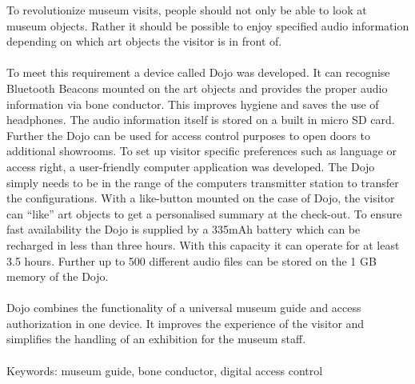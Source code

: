 To revolutionize museum visits, people should not only be able to look at museum objects. Rather it should be possible to enjoy specified audio information depending on which art objects the visitor is in front of.\\\\ To meet this requirement a device called Dojo was developed. It can recognise Bluetooth Beacons mounted on the art objects and provides the proper audio information via bone conductor. This improves hygiene and saves the use of headphones. The audio information itself is stored on a built in micro SD card. Further the Dojo can be used for access control purposes to open doors to additional showrooms. To set up visitor specific preferences such as language or access right, a user-friendly computer application was developed. The Dojo simply needs to be in the range of the computers transmitter station to transfer the configurations. With a like-button mounted on the case of Dojo, the visitor can ``like'' art objects to get a personalised summary at the check-out. To ensure fast availability the Dojo is supplied by a 335mAh battery which can be recharged in less than three hours. With this capacity it can operate for at least 3.5 hours. Further up to 500 different audio files can be stored on the 1 GB memory of the Dojo.\\\\ Dojo combines the functionality of a universal museum guide and access authorization in one device. It improves the experience of the visitor and simplifies the handling of an exhibition for the museum staff.\\\\Keywords: museum guide, bone conductor, digital access control
